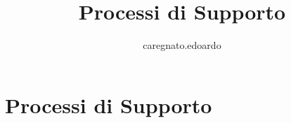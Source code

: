 \documentclass{article}
\title{Processi di Supporto}
\author{caregnato.edoardo }
\begin{document}
\section{Processi di Supporto}


\newpage

\newpage

\newpage

\newpage

\newpage

\newpage

\newpage

\newpage
\end{document}
